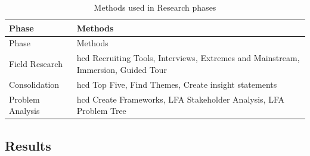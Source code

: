 \hypertarget{tbl:research-methods}{}
\begin{longtable}{@{}ll@{}}
\caption{\label{tbl:research-methods}Methods used in Research phases}\tabularnewline
\toprule
\begin{minipage}[b]{0.28\columnwidth}\raggedright
Phase\strut
\end{minipage} & \begin{minipage}[b]{0.66\columnwidth}\raggedright
Methods\strut
\end{minipage}\tabularnewline
\midrule
\endfirsthead
\toprule
\begin{minipage}[b]{0.28\columnwidth}\raggedright
Phase\strut
\end{minipage} & \begin{minipage}[b]{0.66\columnwidth}\raggedright
Methods\strut
\end{minipage}\tabularnewline
\midrule
\endhead
\begin{minipage}[t]{0.28\columnwidth}\raggedright
Field Research\strut
\end{minipage} & \begin{minipage}[t]{0.66\columnwidth}\raggedright
\gls{hcd} Recruiting Tools, Interviews, Extremes and Mainstream, Immersion, Guided Tour\strut
\end{minipage}\tabularnewline
\begin{minipage}[t]{0.28\columnwidth}\raggedright
Consolidation\strut
\end{minipage} & \begin{minipage}[t]{0.66\columnwidth}\raggedright
\gls{hcd} Top Five, Find Themes, Create insight statements\strut
\end{minipage}\tabularnewline
\begin{minipage}[t]{0.28\columnwidth}\raggedright
Problem Analysis\strut
\end{minipage} & \begin{minipage}[t]{0.66\columnwidth}\raggedright
\gls{hcd} Create Frameworks, LFA Stakeholder Analysis, LFA Problem Tree\strut
\end{minipage}\tabularnewline
\bottomrule
\end{longtable}

\hypertarget{sec:problem-analysis-results}{%
\subsection{Results}\label{sec:problem-analysis-results}}
\vspace{10pt}

